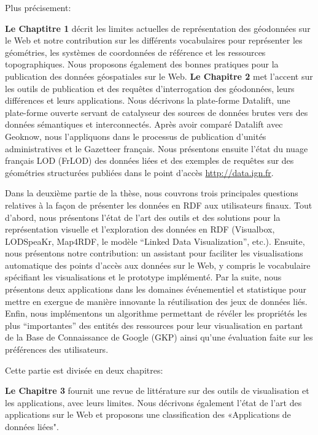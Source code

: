 \documentclass[a4paper,11pt,twoside]{report}
\begin{document}
Plus précisement:

 
  \textbf{Le Chaptitre 1} 
  décrit les limites actuelles de représentation des géodonnées sur le Web et notre contribution sur les différents vocabulaires pour représenter les géométries, les systèmes de coordonnées de référence et les ressources topographiques. Nous proposons également des bonnes pratiques pour la publication des données géospatiales sur le Web.
 \textbf{Le Chapitre 2} 
 met l'accent sur les outils de publication et des requêtes d'interrogation des géodonnées, leurs différences et leurs applications. Nous décrivons la plate-forme Datalift, une plate-forme ouverte servant de catalyseur des sources de données brutes vers des données sémantiques et interconnectés. Après avoir comparé Datalift avec Geoknow, nous l'appliquons dans le processus de publication d'unités administratives et le Gazetteer français. Nous présentons ensuite l'état du nuage français LOD (FrLOD) des données liées et des exemples de requêtes sur des géométries structurées publiées dans le point d'accès \url{http://data.ign.fr}.
 
 
 Dans la deuxième partie de la thèse, nous couvrons trois principales questions relatives à la façon de présenter les données en RDF aux utilisateurs finaux. Tout d'abord, nous présentons l'état de l'art des outils et des solutions pour la représentation visuelle et l'exploration des données en RDF (Visualbox, LODSpeaKr, Map4RDF, le modèle ``Linked Data Visualization'', etc.). Ensuite, nous présentons notre contribution: un assistant pour faciliter les visualisations automatique des points d'accès aux données sur le Web, y compris le vocabulaire spécifiant les visualisations et le prototype implémenté. Par la suite, nous présentons deux applications dans les domaines événementiel et statistique pour mettre en exergue de manière innovante la réutilisation des jeux de données liés. Enfin, nous implémentons un algorithme permettant de révéler les propriétés les plus ``importantes'' des entités des ressources pour leur visualisation en partant de la Base de Connaissance de Google (GKP) ainsi qu'une évaluation faite sur les préférences des utilisateurs. 
 
 Cette partie est divisée en deux chapitres:
 
  \textbf{Le Chapitre 3} 
  fournit une revue de littérature sur des outils de visualisation et les applications, avec leurs limites. Nous décrivons également l'état de l'art des applications sur le Web et proposons une classification des «Applications de données liées".
  
\end{document}

